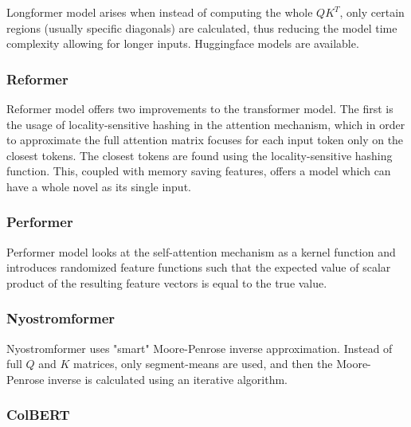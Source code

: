 Longformer model \citep{longformer} arises when instead of computing the whole $QK^T$, only certain regions (usually specific diagonals) are calculated, thus reducing the model time complexity allowing for longer inputs.
Huggingface models are available.

\subsubsection{Reformer}

Reformer model \citep{reformer} offers two improvements to the transformer model.
The first is the usage of locality-sensitive hashing in the attention mechanism, which in order to approximate the full attention matrix focuses for each input token only on the closest tokens.
The closest tokens are found using the locality-sensitive hashing function.
This, coupled with memory saving features, offers a model which can have a whole novel as its single input.

\subsubsection{Performer}

Performer model \citep{performer} looks at the self-attention mechanism as a kernel function and introduces randomized feature functions such that the expected value of scalar product %
of the resulting feature vectors is equal to the true value.

\subsubsection{Nyostromformer}

Nyostromformer \citep{nystrom} uses "smart" Moore-Penrose inverse approximation. Instead of full $Q$ and $K$ matrices, only segment-means are used, and then the Moore-Penrose inverse is calculated using an iterative algorithm.

\subsubsection{ColBERT}


